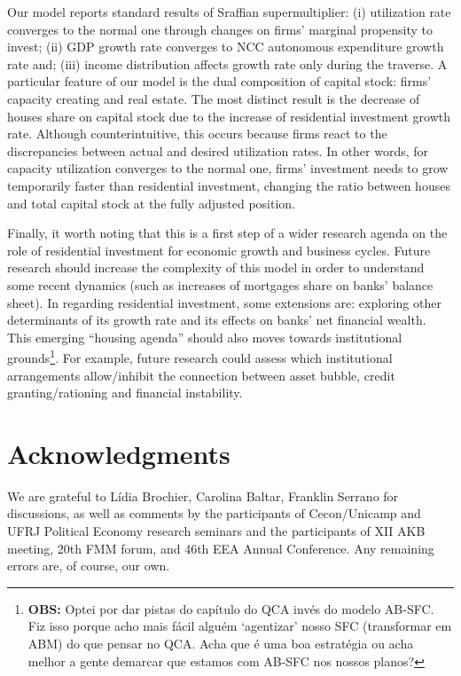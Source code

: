\documentclass[11pt]{article}
\begin{document}
Our model reports standard results of Sraffian supermultiplier:
    (i) utilization rate converges to the normal one through changes on firms' marginal propensity to invest;
    (ii) GDP growth rate converges to NCC autonomous expenditure growth rate and;
    (iii) income distribution affects growth rate only during the traverse.
A particular feature of our model is the dual composition of capital stock: firms' capacity creating and real estate.
The most distinct result is the decrease of houses share on capital stock due to the increase of residential investment growth rate.
Although counterintuitive, this occurs because firms react to the discrepancies between actual and desired utilization rates.
In other words, for capacity utilization converges to the normal one,  firms' investment needs to grow temporarily faster than residential investment, changing the ratio between houses and total capital stock at the fully adjusted position.

Finally, it worth noting that this is a first step of a wider research agenda on the role of residential investment for economic growth and business cycles. 
Future research should increase the complexity of this model in order to understand some recent dynamics (such as increases of mortgages share on banks' balance sheet). 
In regarding residential investment, some extensions are: exploring other determinants of its growth rate and  its effects on banks' net financial wealth.
This emerging ``housing agenda'' should also moves towards institutional grounds\footnote{\textbf{OBS:} Optei por dar pistas do capítulo do QCA invés do modelo AB-SFC. Fiz isso porque acho mais fácil alguém `agentizar' nosso SFC (transformar em ABM) do que pensar no QCA. Acha que é uma boa estratégia ou acha melhor a gente demarcar que estamos com AB-SFC nos nossos planos?}.
For example, future research could assess which institutional arrangements allow/inhibit the connection between asset bubble, credit granting/rationing and financial instability.


\section*{Acknowledgments}
\label{sec:org62e1145}
\noindent We  are  grateful  to  Lídia  Brochier,  Carolina  Baltar,  Franklin  Serrano  for  discussions,  as  well  as  comments  by  the participants of Cecon/Unicamp and UFRJ Political Economy research seminars and the participants of XII AKB meeting, 20th FMM forum, and 46th EEA Annual Conference. Any remaining errors are, of course, our own.
\end{document}

